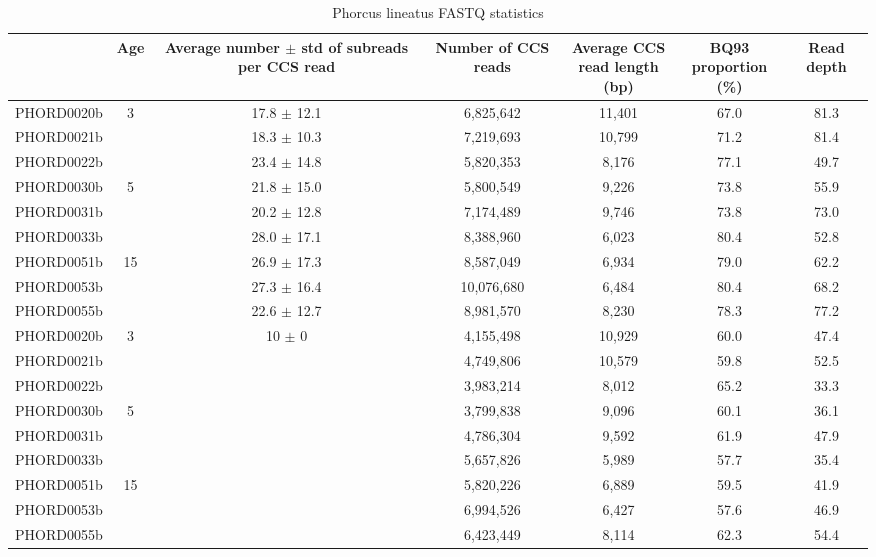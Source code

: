 \begin{table}[h!]
\caption{Phorcus lineatus FASTQ statistics}
\label{tab:phorcus-lineatus-fastq-statistics}
\begin{adjustbox}{max width=1.1\textwidth,center}
\begin{tabular}{c|c|c|c|c|c|c}
& Age & \makecell[{c}]{Average number $\pm$  std \\ of subreads per CCS read }  & Number of CCS reads & \makecell[{c}]{Average CCS \\ read length (bp)} &  \makecell[{c}]{BQ93 \\ proportion (\%)} & Read depth \\ \hline
PHORD0020b &  \multirow{2}{*}{3} & 17.8 $\pm$ 12.1 & 6,825,642 & 11,401 & 67.0 & 81.3 \\ \cline{1-1}\cline{3-7}
PHORD0021b & & 18.3 $\pm$ 10.3 & 7,219,693 & 10,799 & 71.2 & 81.4  \\ \cline{1-2}\cline{3-7}
PHORD0022b & & 23.4 $\pm$ 14.8 & 5,820,353 & 8,176 & 77.1 & 49.7 \\ \hline
PHORD0030b & \multirow{2}{*}{5} & 21.8 $\pm$ 15.0 & 5,800,549 & 9,226 & 73.8 & 55.9  \\ \cline{1-1}\cline{3-7}
PHORD0031b & & 20.2 $\pm$ 12.8 & 7,174,489 & 9,746 & 73.8 & 73.0 \\ \cline{1-2}\cline{3-7}
PHORD0033b & & 28.0 $\pm$ 17.1 & 8,388,960 & 6,023 & 80.4 & 52.8 \\ \hline
PHORD0051b & \multirow{2}{*}{15} & 26.9 $\pm$ 17.3 & 8,587,049 & 6,934 & 79.0 & 62.2   \\ \cline{1-1}\cline{3-7}
PHORD0053b & & 27.3 $\pm$ 16.4 & 10,076,680 & 6,484 & 80.4 & 68.2 \\ \cline{1-2}\cline{3-7}
PHORD0055b & & 22.6 $\pm$ 12.7 & 8,981,570 & 8,230 & 78.3 & 77.2 \\ \hline
PHORD0020b & \multirow{2}{*}{3} & \multirow{6}{*}{10 $\pm$ 0} & 4,155,498 & 10,929 & 60.0  & 47.4  \\ \cline{1-1}\cline{4-7}
PHORD0021b & &  & 4,749,806 & 10,579 & 59.8 & 52.5  \\ \cline{1-2}\cline{4-7}
PHORD0022b & &  & 3,983,214 & 8,012 & 65.2 & 33.3 \\ \cline{1-2}\cline{4-7}
PHORD0030b & \multirow{2}{*}{5} & & 3,799,838 & 9,096 & 60.1 & 36.1  \\ \cline{1-1}\cline{4-7}
PHORD0031b & & & 4,786,304 & 9,592 & 61.9 & 47.9  \\ \cline{1-2}\cline{4-7}
PHORD0033b & & & 5,657,826 & 5,989 & 57.7 & 35.4  \\ \cline{1-2}\cline{4-7}
PHORD0051b & \multirow{2}{*}{15} &  & 5,820,226 & 6,889 & 59.5 & 41.9  \\ \cline{1-1}\cline{4-7}
PHORD0053b & &  & 6,994,526 & 6,427 & 57.6 & 46.9  \\ \hline
PHORD0055b & &  & 6,423,449 & 8,114 & 62.3 & 54.4 \\ \hline
\end{tabular}
\end{adjustbox}
\end{table}

